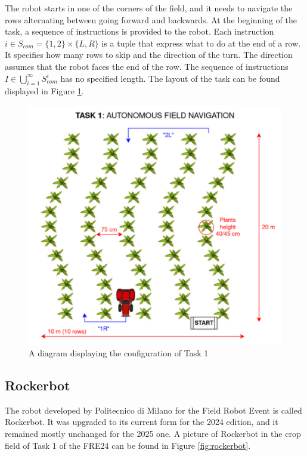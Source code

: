 \documentclass[11pt,a4paper,twocolumn]{article}
\begin{document}
The robot starts in one of the corners of the field, and it needs to navigate the rows alternating between going forward and backwards. At the beginning of the task, a sequence of instructions is provided to the robot. Each instruction $i \in S_{com} = \{1,2\} \times \{L, R\}$ is a tuple that express what to do at the end of a row. It specifies how many rows to skip and the direction of the turn. The direction assumes that the robot faces the end of the row. The sequence of instructions $I \in \bigcup_{i=1}^{\infty}S_{com}^i$ has no specified length. The layout of the task can be found displayed in Figure \ref{fig:task1}.

\begin{figure}
    \centering
    \includegraphics[width=\linewidth]{Multidisciplinary_Project_Report//Images/Task1Schema.png}
    \caption{A diagram displaying the configuration of Task 1}
    \label{fig:task1}
\end{figure}

\subsection{Rockerbot}
\label{sec:rockerbot}

The robot developed by Politecnico di Milano for the Field Robot Event is called Rockerbot. It was upgraded to its current form for the 2024 edition, and it remained mostly unchanged for the 2025 one. A picture of Rockerbot in the crop field of Task 1 of the FRE24 can be found in Figure \ref{fig:rockerbot}.
\end{document}
